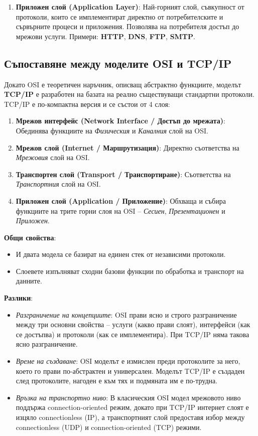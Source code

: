 \documentclass{scrartcl}
\begin{document}
\begin{FlushLeft}
\begin{enumerate}
    \item \textbf{Приложен слой (Application Layer)}: Най-горният слой, съвкупност от протоколи, които се имплементират директно от потребителските и сървърните процеси и приложения. Позволява на потребителя достъп до мрежови услуги. Примери: \textbf{HTTP}, \textbf{DNS}, \textbf{FTP}, \textbf{SMTP}.
\end{enumerate}

\subsection{Съпоставяне между моделите OSI и TCP/IP}
Докато OSI е теоретичен наръчник, описващ абстрактно функциите, моделът \textbf{TCP/IP} е разработен на базата на реално съществуващи стандартни протоколи. TCP/IP е по-компактна версия и се състои от 4 слоя:
\begin{enumerate}
    \item \textbf{Мрежов интерфейс (Network Interface / Достъп до мрежата)}: Обединява функциите на \textit{Физическия} и \textit{Каналния} слой на OSI.
    \item \textbf{Мрежов слой (Internet / Маршрутизация)}: Директно съответства на \textit{Мрежовия} слой на OSI.
    \item \textbf{Транспортен слой (Transport / Транспортиране)}: Съответства на \textit{Транспортния} слой на OSI.
    \item \textbf{Приложен слой (Application / Приложение)}: Обхваща и събира функциите на трите горни слоя на OSI – \textit{Сесиен}, \textit{Презентационен} и \textit{Приложен}.
\end{enumerate}

\textbf{Общи свойства}:
\begin{itemize}
    \item И двата модела се базират на единен стек от независими протоколи.
    \item Слоевете изпълняват сходни базови функции по обработка и транспорт на данните.
\end{itemize}

\textbf{Разлики}:
\begin{itemize}
    \item \textit{Разграничение на концепциите}: OSI прави ясно и строго разграничение между три основни свойства – услуги (какво прави слоят), интерфейси (как се достъпва) и протоколи (как се имплементира). При TCP/IP няма такова ясно разграничение.
    \item \textit{Време на създаване}: OSI моделът е измислен преди протоколите за него, което го прави по-абстрактен и универсален. Моделът TCP/IP е създаден след протоколите, нагоден е към тях и подмяната им е по-трудна.
    \item \textit{Връзка на транспортно ниво}: В класическия OSI модел мрежовото ниво поддържа connection-oriented режим, докато при TCP/IP интернет слоят е изцяло connectionless (IP), а транспортният слой предоставя избор между connectionless (UDP) и connection-oriented (TCP) режими.
\end{itemize}



\end{FlushLeft}
\end{document}

